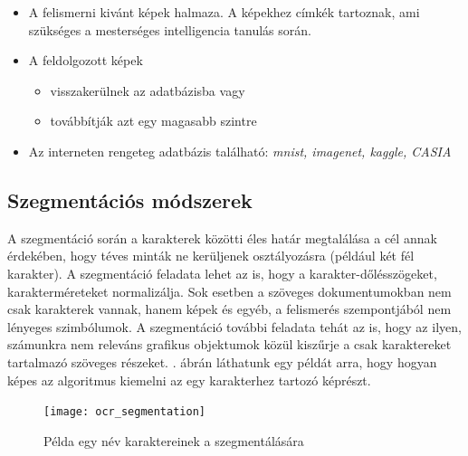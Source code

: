 \begin{itemize}
\item A felismerni kivánt képek halmaza. A képekhez címkék tartoznak, ami szükséges a mesterséges intelligencia tanulás során.
\item A feldolgozott képek
	\begin{itemize}
	\item visszakerülnek az adatbázisba vagy
	\item továbbítják azt egy magasabb szintre
	\end{itemize}	  
\item Az interneten rengeteg adatbázis található: \textit{mnist, imagenet, kaggle, CASIA}
\end{itemize}

\subsection{Szegmentációs módszerek}

A szegmentáció során a karakterek közötti éles határ megtalálása a cél annak érdekében, hogy téves minták ne kerüljenek osztályozásra (például két fél karakter). A szegmentáció feladata lehet az is, hogy a karakter-dőlésszögeket, karakterméreteket normalizálja. Sok esetben a szöveges dokumentumokban nem csak karakterek vannak, hanem képek és egyéb, a felismerés szempontjából nem lényeges szimbólumok. A szegmentáció további feladata tehát az is, hogy az ilyen, számunkra nem releváns grafikus objektumok közül kiszűrje a csak karaktereket tartalmazó szöveges részeket. . ábrán láthatunk egy példát arra, hogy hogyan képes az algoritmus kiemelni az egy karakterhez tartozó képrészt.

\begin{figure}[h]
\centering
\texttt{[image: ocr\_segmentation]}
\caption{Példa egy név karaktereinek a szegmentálására}
\label{fig:ocr_segmentation}
{\cite{tmwebdvi77}}
\end{figure}

